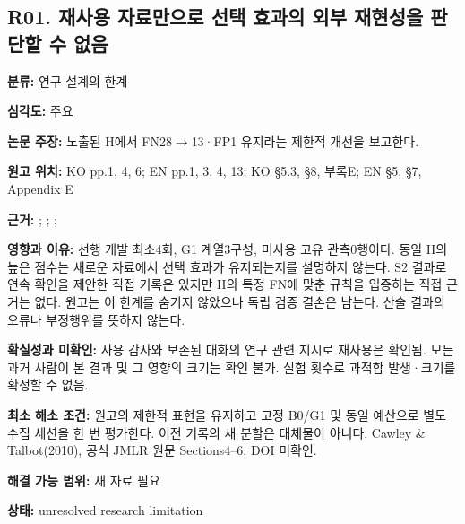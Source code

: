 \documentclass[11pt,a4paper]{article}
\begin{document}
\subsection*{R01. 재사용 자료만으로 선택 효과의 외부 재현성을 판단할 수 없음}
\textbf{분류:} 연구 설계의 한계
\par
\textbf{심각도:} 주요
\par
\textbf{논문 주장:} 노출된 H에서 FN28$\to$13·FP1 유지라는 제한적 개선을 보고한다.
\par
\textbf{원고 위치:} KO pp.1, 4, 6; EN pp.1, 3, 4, 13; KO §5.3, §8, 부록E; EN §5, §7, Appendix E
\par
\textbf{근거:} ; ; ; 
\par
\textbf{영향과 이유:} 선행 개발 최소4회, G1 계열3구성, 미사용 고유 관측0행이다. 동일 H의 높은 점수는 새로운 자료에서 선택 효과가 유지되는지를 설명하지 않는다. S2 결과로 연속 확인을 제안한 직접 기록은 있지만 H의 특정 FN에 맞춘 규칙을 입증하는 직접 근거는 없다. 원고는 이 한계를 숨기지 않았으나 독립 검증 결손은 남는다. 산술 결과의 오류나 부정행위를 뜻하지 않는다.
\par
\textbf{확실성과 미확인:} 사용 감사와 보존된 대화의 연구 관련 지시로 재사용은 확인됨. 모든 과거 사람이 본 결과 및 그 영향의 크기는 확인 불가. 실험 횟수로 과적합 발생·크기를 확정할 수 없음.
\par
\textbf{최소 해소 조건:} 원고의 제한적 표현을 유지하고 고정 B0/G1 및 동일 예산으로 별도 수집 세션을 한 번 평가한다. 이전 기록의 새 분할은 대체물이 아니다. Cawley \& Talbot(2010), 공식 JMLR 원문 Sections4–6; DOI 미확인.
\par
\textbf{해결 가능 범위:} 새 자료 필요
\par
\textbf{상태:} unresolved research limitation
\par
\end{document}
